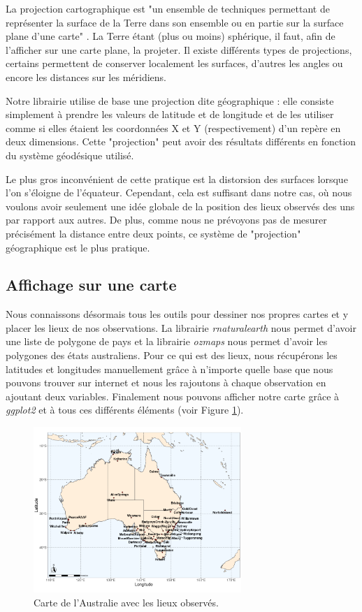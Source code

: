 \documentclass{article}
\begin{document}
La projection cartographique est "un ensemble de techniques permettant de représenter la surface de la Terre dans son ensemble ou en partie sur la surface plane d'une carte" \cite{frwiki:181713838}. La Terre étant (plus ou moins) sphérique, il faut, afin de l'afficher sur une carte plane, la projeter. Il existe différents types de projections, certains permettent de conserver localement les surfaces, d'autres les angles ou encore les distances sur les méridiens. 

Notre librairie utilise de base une projection dite géographique : elle consiste simplement à prendre les valeurs de latitude et de longitude et de les utiliser comme si elles étaient les coordonnées X et Y (respectivement) d'un repère en deux dimensions. Cette "projection" peut avoir des résultats différents en fonction du système géodésique utilisé. 

Le plus gros inconvénient de cette pratique est la distorsion des surfaces lorsque l'on s'éloigne de l'équateur. Cependant, cela est suffisant dans notre cas, où nous voulons avoir seulement une idée globale de la position des lieux observés des uns par rapport aux autres. De plus, comme nous ne prévoyons pas de mesurer précisément la distance entre deux points, ce système de "projection" géographique est le plus pratique.

\subsection{Affichage sur une carte}

Nous connaissons désormais tous les outils pour dessiner nos propres cartes et y placer les lieux de nos observations. La librairie \emph{rnaturalearth} nous permet d'avoir une liste de polygone de pays et la librairie \emph{ozmaps} \cite{ozmaps} nous permet d'avoir les polygones des états australiens. Pour ce qui est des lieux, nous récupérons les latitudes et longitudes manuellement grâce à n'importe quelle base que nous pouvons trouver sur internet et nous les rajoutons à chaque observation en ajoutant deux variables. Finalement nous pouvons afficher notre carte grâce à \emph{ggplot2} \cite{ggplot2} et à tous ces différents éléments (voir Figure \ref{fig:carte_australie}).

\begin{figure}[htp]
    \centering
    \includegraphics[width=0.7\textwidth]{Images/Cartographie/Australia_full_map.png}
    \caption{Carte de l'Australie avec les lieux observés.}
    \label{fig:carte_australie}
\end{figure}
\end{document}
